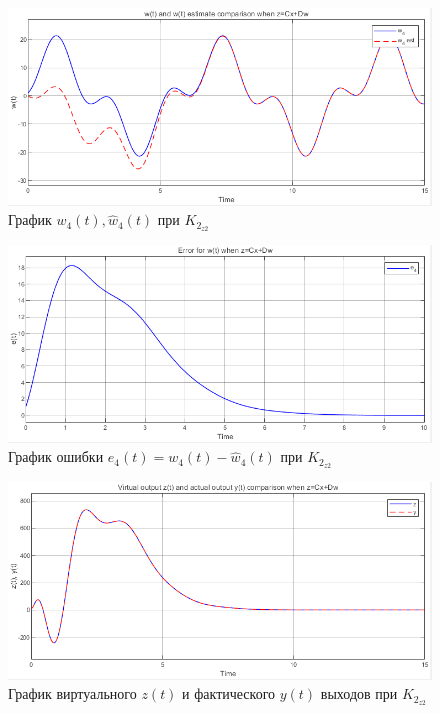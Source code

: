 \documentclass[a4paper, 12pt]{article}
\begin{document}
    \begin{figure}[H]
        \centering
        \includegraphics[scale=0.75]{3task_wwh4cd.png}
        \captionsetup{skip=0pt}
        \caption{График $w_4(t),\hat{w}_4(t)$ при $K_{2_{z2}}$}
        \label{fig:3task_wwh4cd}
    \end{figure}
    \begin{figure}[H]
        \centering
        \includegraphics[scale=0.75]{3task_we4cd.png}
        \captionsetup{skip=0pt}
        \caption{График ошибки $e_4(t)=w_4(t)-\hat{w}_4(t)$ при $K_{2_{z2}}$}
        \label{fig:3task_we4cd}
    \end{figure}
    \begin{figure}[H]
        \centering
        \includegraphics[scale=0.75]{3task_zcd.png}
        \captionsetup{skip=0pt}
        \caption{График виртуального $z(t)$ и фактического $y(t)$ выходов при $K_{2_{z2}}$}
        \label{fig:3task_zcd}
    \end{figure}
\end{document}
